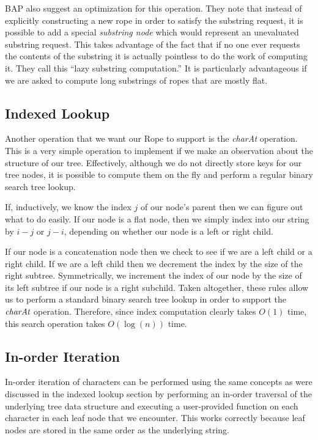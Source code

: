 \documentclass[12pt]{article}
\begin{document}
BAP also suggest an optimization for this operation. They note that instead of explicitly constructing a new rope in order to satisfy the substring request, it is possible to add a special \emph{substring node} which would represent an unevaluated substring request. This takes advantage of the fact that if no one ever requests the contents of the substring it is actually pointless to do the work of computing it. They call this ``lazy substring computation.'' It is particularly advantageous if we are asked to compute long substrings of ropes that are mostly flat.

\subsection{Indexed Lookup}

Another operation that we want our Rope to support is the \emph{charAt} operation. This is a very simple operation to implement if we make an observation about the structure of our tree. Effectively, although we do not directly store keys for our tree nodes, it is possible to compute them on the fly and perform a regular binary search tree lookup.

If, inductively, we know the index $j$ of our node's parent then we can figure out what to do easily. If our node is a flat node, then we simply index into our string by $i - j$ or $j - i$, depending on whether our node is a left or right child. 

If our node is a concatenation node then we check to see if we are a left child or a right child. If we are a left child then we decrement the index by the size of the right subtree. Symmetrically, we increment the index of our node by the size of its left subtree if our node is a right subchild. Taken altogether, these rules allow us to perform a standard binary search tree lookup in order to support the $\emph{charAt}$ operation. Therefore, since index computation clearly takes $O(1)$ time, this search operation takes $O(\log(n))$ time.


\subsection{In-order Iteration}

In-order iteration of characters can be performed using the same concepts as were discussed in the indexed lookup section by performing an in-order traversal of the underlying tree data structure and executing a user-provided function on each character in each leaf node that we encounter. This works correctly because leaf nodes are stored in the same order as the underlying string.
\end{document}
